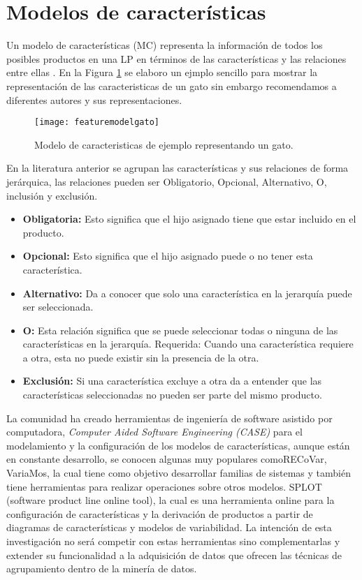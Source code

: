 \section{Modelos de características}

Un modelo de características (MC) representa la información de todos los posibles productos en una LP en términos de las características y las relaciones entre ellas \cite{Zhou2013}. En la Figura \ref{featuremodelgato} se elaboro un ejmplo sencillo para mostrar la representación de las caracteristicas de un gato sin embargo recomendamos a diferentes autores y sus representaciones\cite{Santos2015, Felfernig2015, TerBeek2015, Al2013}.
\begin{figure}[h]
	\centering
	\texttt{[image: featuremodelgato]}
	\caption{Modelo de caracteristicas de ejemplo representando un gato.}
	\label{featuremodelgato}
\end{figure}

En la literatura anterior se agrupan las características y sus relaciones de forma jerárquica, las relaciones pueden ser Obligatorio, Opcional, Alternativo, O, inclusión y exclusión\cite{Benavides2010}.
\begin{itemize}
\item{ \textbf{Obligatoria:}}
Esto significa que el hijo asignado tiene que estar incluido en el producto.
\item{ \textbf{Opcional:}}
Esto significa que el hijo asignado puede o no tener esta característica.
\item{ \textbf{Alternativo:}}
Da a conocer que solo una característica en la jerarquía puede ser seleccionada.
\item{ \textbf{O:}}
Esta relación significa que se puede seleccionar todas o ninguna de las características en la jerarquía.
Requerida: Cuando una característica requiere a otra, esta no puede existir sin la presencia de la otra.
\item{ \textbf{Exclusión:}}
Si una característica excluye a otra da a entender que las características seleccionadas no pueden ser parte del mismo producto.
\end{itemize}


La comunidad ha creado herramientas de ingeniería de software asistido por computadora, \textit{Computer Aided Software Engineering (CASE)} para el modelamiento y la configuración de los modelos de características, aunque están en constante desarrollo, se conocen algunas muy populares comoRECoVar\cite{Zhang2013,Bezerra2016}, VariaMos\cite{Mazo2015}, la cual tiene como objetivo desarrollar  familias de sistemas y también tiene herramientas para realizar operaciones sobre otros modelos. SPLOT (software product line online tool)\cite{Mendonca:2009:SSP:1639950.1640002}, la cual es una herramienta online para la configuración de características y la derivación de productos a partir de diagramas de características y modelos de variabilidad. La intención de esta investigación no será competir con estas herramientas sino complementarlas y extender su funcionalidad a la adquisición de datos que ofrecen las técnicas de agrupamiento dentro de la minería de datos.

	
